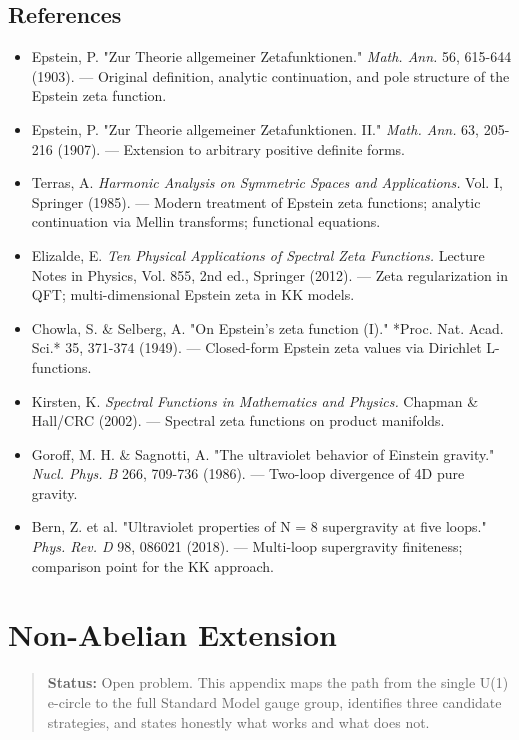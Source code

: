 \documentclass[aps,prd,preprint,superscriptaddress,longbibliography,floatfix]{revtex4-2}
\theoremstyle{remark}
\begin{document}
\subsection{References}


\begin{itemize}
  \item Epstein, P. "Zur Theorie allgemeiner Zetafunktionen." \textit{Math. Ann.} 56, 615-644 (1903). --- Original definition, analytic continuation, and pole structure of the Epstein zeta function.
  \item Epstein, P. "Zur Theorie allgemeiner Zetafunktionen. II." \textit{Math. Ann.} 63, 205-216 (1907). --- Extension to arbitrary positive definite forms.
  \item Terras, A. \textit{Harmonic Analysis on Symmetric Spaces and Applications.} Vol. I, Springer (1985). --- Modern treatment of Epstein zeta functions; analytic continuation via Mellin transforms; functional equations.
  \item Elizalde, E. \textit{Ten Physical Applications of Spectral Zeta Functions.} Lecture Notes in Physics, Vol. 855, 2nd ed., Springer (2012). --- Zeta regularization in QFT; multi-dimensional Epstein zeta in KK models.
  \item Chowla, S. \& Selberg, A. "On Epstein's zeta function (I)." *Proc. Nat. Acad. Sci.* 35, 371-374 (1949). --- Closed-form Epstein zeta values via Dirichlet L-functions.
  \item Kirsten, K. \textit{Spectral Functions in Mathematics and Physics.} Chapman \& Hall/CRC (2002). --- Spectral zeta functions on product manifolds.
  \item Goroff, M. H. \& Sagnotti, A. "The ultraviolet behavior of Einstein gravity." \textit{Nucl. Phys. B} 266, 709-736 (1986). --- Two-loop divergence of 4D pure gravity.
  \item Bern, Z. et al. "Ultraviolet properties of N = 8 supergravity at five loops." \textit{Phys. Rev. D} 98, 086021 (2018). --- Multi-loop supergravity finiteness; comparison point for the KK approach.
\end{itemize}


\section{Non-Abelian Extension}


\begin{quote}
\textbf{Status:} Open problem. This appendix maps the path from the single U(1)
e-circle to the full Standard Model gauge group, identifies three candidate
strategies, and states honestly what works and what does not.
\end{quote}
\end{document}
